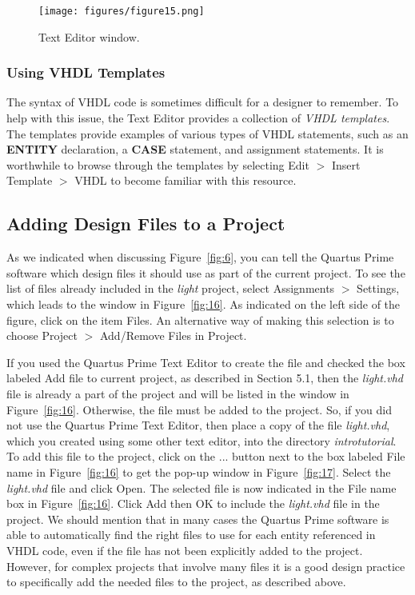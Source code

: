 \begin{figure}[H]
   \begin{center}
      \texttt{[image: figures/figure15.png]}
   \caption{Text Editor window.} 
	 \label{fig:15}
	 \end{center}
\end{figure}

\subsubsection{Using VHDL Templates}

The syntax of VHDL code is sometimes difficult for a
designer to remember. To help with this issue, the Text Editor
provides a collection of {\it VHDL templates}. The templates provide
examples of various types of VHDL statements, such as an {\bf ENTITY}
declaration, a {\bf CASE} statement, and assignment statements. 
It is worthwhile to browse through the templates
by selecting {\sf Edit $>$ Insert Template $>$ VHDL} to become 
familiar with this resource.

\subsection{Adding Design Files to a Project}

As we indicated when discussing Figure~\ref{fig:6}, you can tell the Quartus Prime software
which design files it should use as part of the current project.
To see the list of files already included in the {\it light} project,
select {\sf Assignments $>$ Settings}, which leads to the window in Figure~\ref{fig:16}.
As indicated on the left side of the figure, click on the item {\sf Files}.
An alternative way of making this selection is to choose
{\sf Project $>$ Add/Remove Files in Project}.

If you used the Quartus Prime Text Editor to create the file and checked
the box labeled {\sf Add file to current project},
as described in Section 5.1, then the {\it light.vhd}
file is already a part of the project and will be listed in
the window in Figure~\ref{fig:16}.
Otherwise, the file must be added to the project. 
So, if you did not use the Quartus Prime Text Editor, then place a copy of the 
file {\it light.vhd}, which you created using some other text editor, into 
the directory {\it introtutorial}.
To add this file to the project, click on the {\sf ...} button next to the 
box labeled {\sf File name} in
Figure~\ref{fig:16} to get the pop-up window in Figure~\ref{fig:17}.
Select the {\it light.vhd} file and click {\sf Open}.
The selected file is now indicated in the {\sf File name} box in Figure~\ref{fig:16}. 
Click {\sf Add} then {\sf OK} to include the {\it light.vhd} file in the project.
We should mention that in many cases the Quartus Prime software is able to 
automatically find the right files to use for each entity 
referenced in VHDL code, even if the file has not been 
explicitly added to the project. However, for complex projects that
involve many files it is a good design practice to specifically
add the needed files to the project, as described above.

